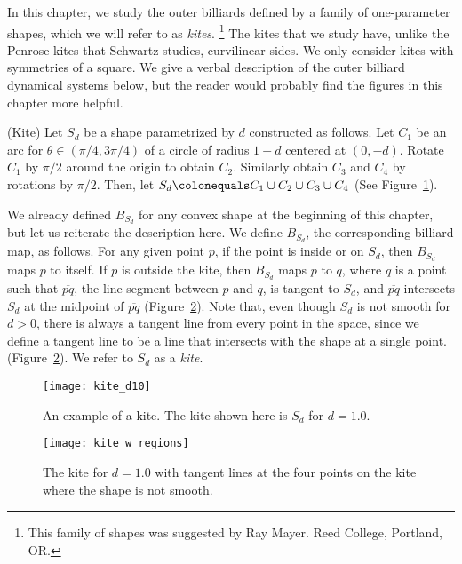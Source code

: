 \documentclass[12pt,twoside]{book}
\begin{document}
In this chapter, we study the outer billiards defined by a family of one-parameter shapes, which we will refer to as \textit{kites}.
\footnote{This family of shapes was suggested by Ray Mayer. Reed College, Portland, OR.}
The kites that we study have, unlike the Penrose kites that Schwartz studies, curvilinear sides.
We only consider kites with symmetries of a square.
We give a verbal description of the outer billiard dynamical systems below, but the reader would probably find the figures in this chapter more helpful.
\begin{definition}
  (Kite)
  Let $S_d$ be a shape parametrized by $d$ constructed as follows.
  Let $C_1$ be an arc for $\theta \in (\pi/4, 3\pi/4)$ of a circle of radius $1+d$ centered at $(0,-d)$.
  Rotate $C_1$ by $\pi/2$ around the origin to obtain $C_2$.
  Similarly obtain $C_3$ and $C_4$ by rotations by $\pi/2$.
  Then, let $S_d \ceq C_1 \cup C_2 \cup C_3 \cup C_4$ (See Figure~\ref{fig:kiteeg}).

  We already defined $B_{S_d}$ for any convex shape at the beginning of this chapter, but let us reiterate the description here.
  We define $B_{S_d}$, the corresponding billiard map, as follows.
  For any given point $p$, if the point is inside or on $S_d$, then $B_{S_d}$ maps $p$ to itself.
  If $p$ is outside the kite, then $B_{S_d}$ maps $p$ to $q$, where $q$ is a point such that $\overline{pq}$, the line segment between $p$ and $q$, is tangent to $S_d$, and $\overline{pq}$ intersects $S_d$ at the midpoint of $\overline{pq}$ (Figure~\ref{fig:kite-regions}).
  Note that, even though $S_d$ is not smooth for $d > 0$, there is always a tangent line from every point in the space, since we define a tangent line to be a line that intersects with the shape at a single point.
 (Figure~\ref{fig:kite-regions}).
  We refer to $S_d$ as a \textit{kite}.

\end{definition}
\begin{figure}[ht]
  \begin{center}
    \texttt{[image: kite\_d10]}
    \caption{An example of a kite. The kite shown here is $S_d$ for $d = 1.0$.}
    \label{fig:kiteeg}
  \end{center}
\end{figure}
\begin{figure}[ht]
  \begin{center}
    \texttt{[image: kite\_w\_regions]}
    \caption{The kite for $d = 1.0$ with tangent lines at the four points on the kite where the shape is not smooth.}
    \label{fig:kite-regions}
  \end{center}
\end{figure}
\end{document}
